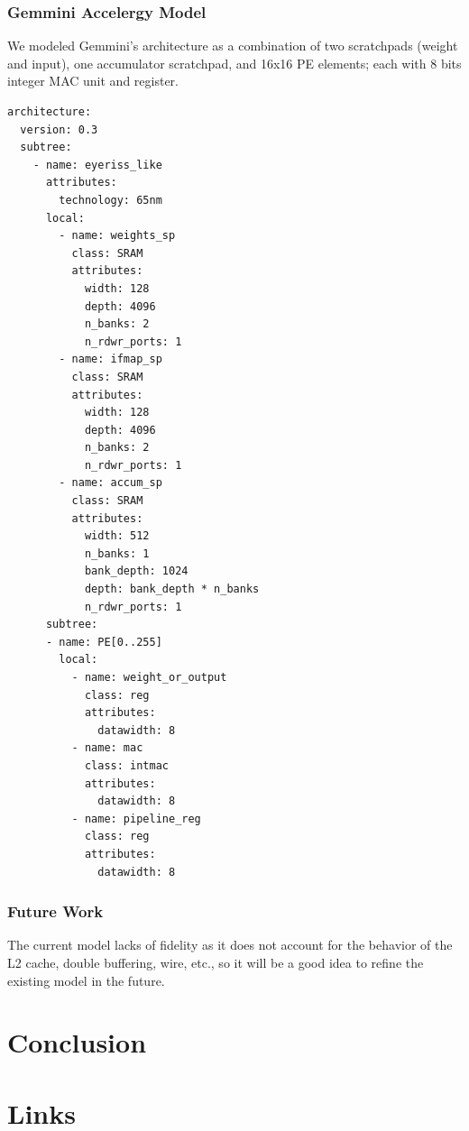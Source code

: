 \documentclass[sigconf]{acmart}
\begin{document}
\subsubsection{Gemmini Accelergy Model}
We modeled Gemmini's architecture as a combination of two scratchpads (weight and input), one accumulator scratchpad, and 16x16 PE elements; each with 8 bits integer MAC unit and register.

\begin{verbatim} 
architecture:
  version: 0.3
  subtree:
    - name: eyeriss_like
      attributes:
        technology: 65nm
      local:
        - name: weights_sp
          class: SRAM
          attributes:
            width: 128
            depth: 4096
            n_banks: 2
            n_rdwr_ports: 1
        - name: ifmap_sp
          class: SRAM
          attributes:
            width: 128
            depth: 4096
            n_banks: 2
            n_rdwr_ports: 1
        - name: accum_sp
          class: SRAM
          attributes:
            width: 512
            n_banks: 1
            bank_depth: 1024
            depth: bank_depth * n_banks
            n_rdwr_ports: 1
      subtree:
      - name: PE[0..255]
        local:
          - name: weight_or_output
            class: reg
            attributes:
              datawidth: 8
          - name: mac
            class: intmac
            attributes:
              datawidth: 8
          - name: pipeline_reg
            class: reg
            attributes:
              datawidth: 8
\end{verbatim}

\subsubsection{Future Work}
The current model lacks of fidelity as it does not account for the behavior of the L2 cache, double buffering, wire, etc., so it will be a good idea to refine the existing model in the future.

\section{Conclusion}

\appendix
\section{Links}
\end{document}

